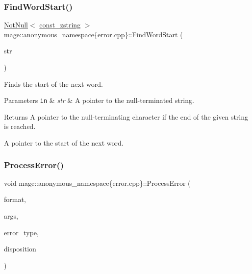 \subsubsection{\texorpdfstring{Find\+Word\+Start()}{FindWordStart()}}
{\footnotesize\ttfamily \mbox{\hyperlink{namespacemage_a8769f9d670d6b585ea306cb1062af94b}{Not\+Null}}$<$ \mbox{\hyperlink{namespacemage_abfd9206dc607ceb5d13ec68bf075a5c0}{const\+\_\+zstring}} $>$ mage\+::anonymous\+\_\+namespace\{error.\+cpp\}\+::Find\+Word\+Start (\begin{DoxyParamCaption}\item[{\mbox{\hyperlink{namespacemage_a8769f9d670d6b585ea306cb1062af94b}{Not\+Null}}$<$ \mbox{\hyperlink{namespacemage_abfd9206dc607ceb5d13ec68bf075a5c0}{const\+\_\+zstring}} $>$}]{str }\end{DoxyParamCaption})\hspace{0.3cm}{\ttfamily [noexcept]}}

Finds the start of the next word.


\begin{DoxyParams}[1]{Parameters}
\mbox{\tt in}  & {\em str} & A pointer to the null-\/terminated string. \\
\hline
\end{DoxyParams}
\begin{DoxyReturn}{Returns}
A pointer to the null-\/terminating character if the end of the given string is reached. 

A pointer to the start of the next word. 
\end{DoxyReturn}
\mbox{\label{namespacemage_1_1anonymous__namespace_02error_8cpp_03_a62bc179e83b7317ab0331cebdc43f980}} 
\subsubsection{\texorpdfstring{Process\+Error()}{ProcessError()}}
{\footnotesize\ttfamily void mage\+::anonymous\+\_\+namespace\{error.\+cpp\}\+::Process\+Error (\begin{DoxyParamCaption}\item[{\mbox{\hyperlink{namespacemage_abfd9206dc607ceb5d13ec68bf075a5c0}{const\+\_\+zstring}}}]{format,  }\item[{va\+\_\+list}]{args,  }\item[{const std\+::string \&}]{error\+\_\+type,  }\item[{\mbox{\hyperlink{namespacemage_1_1anonymous__namespace_02error_8cpp_03_a02d701a32d4f84856df21925fcce5500}{Error\+Disposition}}}]{disposition }\end{DoxyParamCaption})}

